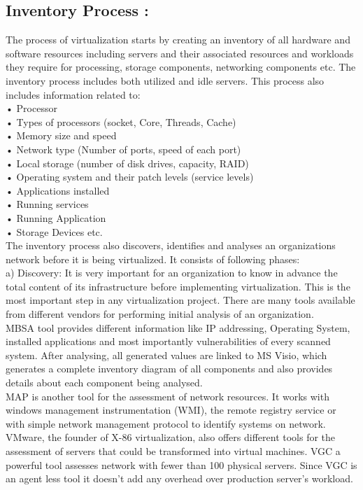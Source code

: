 \documentclass[12pt,a4paper]{report}
\begin{document}
\subsection{Inventory Process :}
The process of virtualization starts by creating an inventory of all hardware and software resources including servers and their associated resources and workloads they require for processing, storage components, networking components etc. The inventory process includes both utilized and idle servers. This process also includes information related to: \\
 • Processor \\
 • Types of processors (socket, Core, Threads, Cache)\\
 • Memory size and speed\\
 • Network type (Number of ports, speed of each port)\\
 • Local storage (number of disk drives, capacity, RAID)\\
 • Operating system and their patch levels (service levels)\\
 • Applications installed\\
 • Running services\\
 • Running Application\\
 • Storage Devices etc. \\
 The inventory process also discovers, identifies and analyses an organizations network before it is being virtualized. It consists of following phases: \\

a)	Discovery: It is very important for an organization to know in advance the total content of its infrastructure before implementing virtualization. This is the most important step in any virtualization project. There are many tools available from different vendors for performing initial analysis of an organization.\\ 
 MBSA tool provides different information like IP addressing, Operating System, installed applications and most importantly vulnerabilities of every scanned system. After analysing, all generated values are linked to MS Visio, which generates a complete inventory diagram of all components and also provides details about each component being analysed.\\
 MAP is another tool for the assessment of network resources. It works with windows management instrumentation (WMI), the remote registry service or with simple network management protocol to identify systems on network. \\
VMware, the founder of X-86 virtualization, also offers different tools for the assessment of servers that could be transformed into virtual machines. VGC a powerful tool assesses network with fewer than 100 physical servers. Since VGC is an agent less tool it doesn’t add any overhead over production server’s workload.\\
\end{document}
